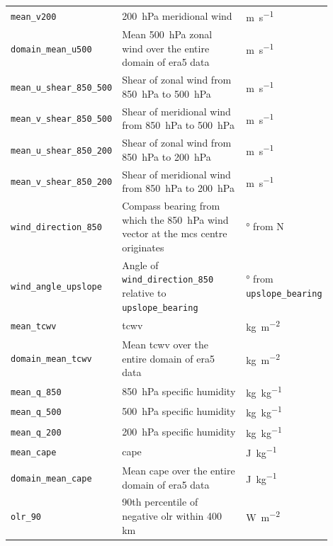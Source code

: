 {\begin{longtable}{>{\raggedright\arraybackslash}p{0.25\linewidth} p{0.50\linewidth} >{\raggedright\arraybackslash}p{0.15\linewidth}}
    \texttt{mean\_v200} & \SI{200}{\hecto\pascal} meridional wind & \unit{\meter\per\second} \\
    \texttt{domain\_mean\_u500} & Mean \SI{500}{\hecto\pascal} zonal wind over the entire domain of \acrshort{era5} data & \unit{\meter\per\second} \\
    \texttt{mean\_u\_shear\_850\_500} & Shear of zonal wind from \SI{850}{\hecto\pascal} to \SI{500}{\hecto\pascal} & \unit{\meter\per\second} \\
    \texttt{mean\_v\_shear\_850\_500} & Shear of meridional wind from \SI{850}{\hecto\pascal} to \SI{500}{\hecto\pascal} & \unit{\meter\per\second} \\
    \texttt{mean\_u\_shear\_850\_200} & Shear of zonal wind from \SI{850}{\hecto\pascal} to \SI{200}{\hecto\pascal} & \unit{\meter\per\second} \\
    \texttt{mean\_v\_shear\_850\_200} & Shear of meridional wind from \SI{850}{\hecto\pascal} to \SI{200}{\hecto\pascal} & \unit{\meter\per\second} \\
    \texttt{wind\_direction\_850} & Compass bearing from which the \SI{850}{\hecto\pascal} wind vector at the \acrshort{mcs} centre originates & \unit{\degree} from  N \\
    \texttt{wind\_angle\_upslope} & Angle of \texttt{wind\_direction\_850} relative to \texttt{upslope\_bearing} & \unit{\degree} from \texttt{upslope\_bearing} \\
    \texttt{mean\_tcwv} & \acrfull{tcwv} & \unit{\kilogram\per\meter\squared} \\
    \texttt{domain\_mean\_tcwv} & Mean \acrshort{tcwv} over the entire domain of \acrshort{era5} data & \unit{\kilogram\per\meter\squared} \\
    \texttt{mean\_q\_850} & \SI{850}{\hecto\pascal} specific humidity & \unit{\kilogram\per\kilogram} \\
    \texttt{mean\_q\_500} & \SI{500}{\hecto\pascal} specific humidity & \unit{\kilogram\per\kilogram} \\
    \texttt{mean\_q\_200} & \SI{200}{\hecto\pascal} specific humidity & \unit{\kilogram\per\kilogram} \\
    \texttt{mean\_cape} & \acrfull{cape} & \unit{\joule\per\kilogram} \\
    \texttt{domain\_mean\_cape} & Mean \acrshort{cape} over the entire domain of \acrshort{era5} data & \unit{\joule\per\kilogram} \\
    \texttt{olr\_90} & 90th percentile of negative \acrfull{olr} within 400 km & \unit{\watt\per\square\meter} \\

\end{longtable}}

